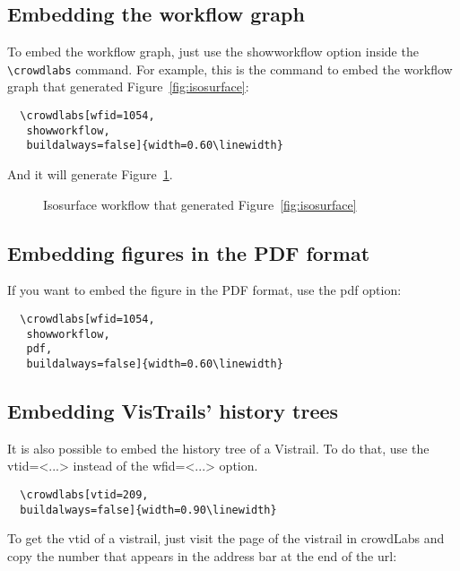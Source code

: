 \documentclass{article}
\begin{document}
\subsection{Embedding the workflow graph}
To embed the workflow graph, just use the \textsf{showworkflow} option inside the \texttt{\textbackslash crowdlabs} command. For example, this is the command to embed the workflow graph that generated Figure~\ref{fig:isosurface}:\\

\begin{verbatim}
  \crowdlabs[wfid=1054,
   showworkflow,
   buildalways=false]{width=0.60\linewidth}
\end{verbatim}

And it will generate Figure~\ref{fig:workflow}.
\begin{figure}[th]
\begin{center}
\end{center}
\vspace{-.5cm}
\caption{Isosurface workflow that generated Figure~\ref{fig:isosurface}}
\label{fig:workflow}
\end{figure}

\subsection{Embedding figures in the PDF format}
If you want to embed the figure in the PDF format, use the \textsf{pdf} option:

\begin{verbatim}
  \crowdlabs[wfid=1054,
   showworkflow,
   pdf,
   buildalways=false]{width=0.60\linewidth}
\end{verbatim}


\subsection{Embedding VisTrails' history trees}

It is also possible to embed the history tree of a Vistrail. To do that, use the \textsf{vtid=<...>} instead of the \textsf{wfid=<...>} option.

\begin{verbatim}
  \crowdlabs[vtid=209,
  buildalways=false]{width=0.90\linewidth}    
\end{verbatim}

To get the \textsf{vtid} of a vistrail, just visit the page of the vistrail in crowdLabs and copy the number that appears in the address bar at the end of the url:
\end{document}
